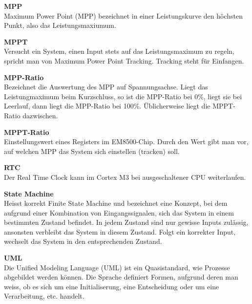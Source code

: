 \textbf{MPP}\\
\forceindent Maximum Power Point (MPP) bezeichnet in einer Leistungskurve den höchsten Punkt, also das Leistungsmaxiumum.

\textbf{MPPT}\\
\forceindent Versucht ein System, einen Input stets auf das Leistungsmaximum zu regeln, spricht man von Maximum Power Point Tracking. Tracking steht für Einfangen.

\textbf{MPP-Ratio}\\
\forceindent Bezeichnet die Auswertung des MPP auf Spannungsachse. Liegt das Leistungmaximum beim Kurzschluss, so ist die MPP-Ratio bei 0\thinspace\%, liegt sie bei Leerlauf, dann liegt die MPP-Ratio bei 100\thinspace\%. Üblicherweise liegt die MPPT-Ratio dazwischen.

\textbf{MPPT-Ratio}\\
\forceindent Einstellungswert eines Registers im EM8500-Chip. Durch den Wert gibt man vor, auf welchen MPP das System sich einstellen (tracken) soll.

\textbf{RTC}\\
\forceindent Der Real Time Clock kann im Cortex M3 bei ausgeschaltener CPU weiterlaufen.  

\textbf{State Machine}\\
\forceindent Heisst korrekt Finite State Machine und bezeichnet eine Konzept, bei dem aufgrund einer Kombination von Eingangssignalen, sich das System in einem bestimmten Zustand befindet. In jedem Zustand sind nur gewisse Inputs zulässig, ansonsten verbleibt das System in diesem Zustand. Folgt ein korrekter Input, wechselt das System in den entsprechenden Zustand. 

\textbf{UML}\\
\forceindent Die Unified Modeling Language (UML) ist ein Quasistandard, wie Prozesse abgebildet werden können. Die Sprache definiert Formen, aufgrund deren man weiss, ob es sich um eine Initialiserung, eine Entscheidung oder um eine Verarbeitung, etc. handelt.


\makeatletter
\renewcommand\listoffigures{%
    \section{\listfigurename}%
      \@mkboth{\listfigurename}%
              {\listfigurename}%
    \@starttoc{lof}%
}
\makeatother

{%
\let\oldnumberline\numberline%
\renewcommand{\numberline}{\figurename~\oldnumberline}%
\listoffigures%
}

